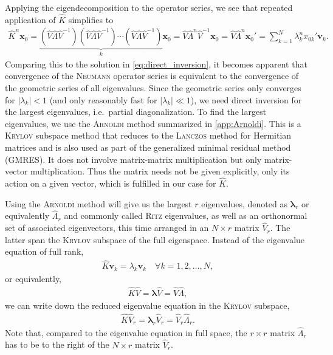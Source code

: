 \documentclass[a4paper, twoside, 10pt, english]{article}
\numberwithin{equation}{section}
\let\vec\symbf
\begin{document}
Applying the eigendecomposition to the operator series, we see that repeated application of $\hat{K}$ simplifies to
\begin{gather}
  \hat{K}^{n} \vec{x}_{0} = \underbrace{\left ( \hat{V} \hat{\Lambda} \hat{V}^{-1} \right ) \left ( \hat{V} \hat{\Lambda} \hat{V}^{-1} \right ) \dotsb \left ( \hat{V} \hat{\Lambda} \hat{V}^{-1} \right )}_{k} \vec{x}_{0}= \hat{V} \hat{\Lambda}^{n} \hat{V}^{-1} \vec{x}_{0} = \hat{V} \hat{\Lambda}^{n} \vec{x}_{0}' = \sum_{k = 1}^{N} \lambda_{k}^{n} x_{0 k}' \vec{v}_{k}.
\end{gather}
Comparing this to the solution in \cref{eq:direct_inversion}, it becomes apparent that convergence of the \textsc{Neumann} operator series is equivalent to the convergence of the geometric series of all eigenvalues. Since the geometric series only converges for $\lvert \lambda_{k} \rvert < 1$ (and only reasonably fast for $\lvert \lambda_{k} \rvert \ll 1$), we need direct inversion for the largest eigenvalues, i.e.\ partial diagonalization. To find the largest eigenvalues, we use the \textsc{Arnoldi} method summarized in \cref{app:Arnoldi}. This is a \textsc{Krylov} subspace method that reduces to the \textsc{Lanczos} method for Hermitian matrices and is also used as part of the generalized minimal residual method (GMRES). It does not involve matrix-matrix multiplication but only matrix-vector multiplication. Thus the matrix needs not be given explicitly, only its action on a given vector, which is fulfilled in our case for $\hat{K}$.

Using the \textsc{Arnoldi} method will give us the largest $r$ eigenvalues, denoted as $\vec{\lambda}_{r}$ or equivalently $\hat{\Lambda}_{r}$ and commonly called \textsc{Ritz} eigenvalues, as well as an orthonormal set of associated eigenvectors, this time arranged in an $N \times r$ matrix $\hat{V}_{r}$. The latter span the \textsc{Krylov} subspace of the full eigenspace. Instead of the eigenvalue equation of full rank,
\begin{gather}
  \hat{K} \vec{v}_{k} = \lambda_{k} \vec{v}_{k} \quad \forall k = 1, 2, \dotsc, N,
\end{gather}
or equivalently,
\begin{gather}
  \hat{K} \hat{V} = \vec{\lambda} \hat{V} = \hat{V} \hat{\Lambda},
\end{gather}
we can write down the reduced eigenvalue equation in the \textsc{Krylov} subspace,
\begin{gather}
  \hat{K} \hat{V}_{r} = \vec{\lambda}_{r} \hat{V}_{r} = \hat{V}_{r} \hat{\Lambda}_{r}. \label{eq:reduced_eigvals}
\end{gather}
Note that, compared to the eigenvalue equation in full space, the $r \times r$ matrix $\hat{\Lambda}_{r}$ has to be to the right of the $N \times r$ matrix $\hat{V}_{r}$.
\end{document}
